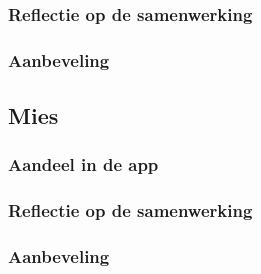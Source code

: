\documentclass[dutch]{report}
\begin{document}
	\subsubsection{Reflectie op de samenwerking}
	\subsubsection{Aanbeveling}
	
	\subsection{Mies}

	\subsubsection{Aandeel in de app}
	\subsubsection{Reflectie op de samenwerking}
	\subsubsection{Aanbeveling}
\end{document}
